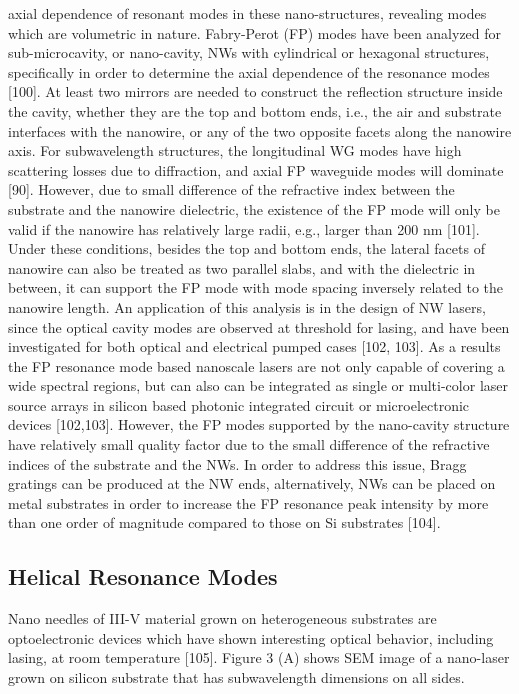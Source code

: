 axial dependence of resonant modes in these nano-structures, revealing modes
which are volumetric in nature.  Fabry-Perot (FP) modes have been analyzed for
sub-microcavity, or nano-cavity, NWs with cylindrical or hexagonal structures,
specifically in order to determine the axial dependence of the resonance modes
[100]. At least two mirrors are needed to construct the reflection structure
inside the cavity, whether they are the top and bottom ends, i.e., the air and
substrate interfaces with the nanowire, or any of the two opposite facets along
the nanowire axis. For subwavelength structures, the longitudinal WG modes have
high scattering losses due to diffraction, and axial FP waveguide modes will
dominate [90]. However, due to small difference of the refractive index between
the substrate and the nanowire dielectric, the existence of the FP mode will
only be valid if the nanowire has relatively large radii, e.g., larger than 200
nm [101]. Under these conditions, besides the top and bottom ends, the lateral
facets of nanowire can also be treated as two parallel slabs, and with the
dielectric in between, it can support the FP mode with mode spacing inversely
related to the nanowire length. An application of this analysis is in the
design of NW lasers, since the optical cavity modes are observed at threshold
for lasing, and have been investigated for both optical and electrical pumped
cases [102, 103]. As a results the FP resonance mode based nanoscale lasers are
not only capable of covering a wide spectral regions, but can also can be
integrated as single or multi-color laser source arrays in silicon based
photonic integrated circuit or microelectronic devices [102,103]. However, the
FP modes supported by the nano-cavity structure have relatively small quality
factor due to the small difference of the refractive indices of the substrate
and the NWs. In order to address this issue,  Bragg gratings can be produced at
the NW ends, alternatively, NWs can be placed on metal substrates in order to
increase the FP resonance peak intensity by more than one order of magnitude
compared to those on Si substrates [104].  \subsection{Helical Resonance Modes}
Nano needles of III-V material grown on heterogeneous substrates are
optoelectronic devices which have shown interesting optical behavior, including
lasing, at room temperature [105]. Figure 3 (A) shows SEM image of a nano-laser
grown on silicon substrate that has subwavelength dimensions on all sides.
